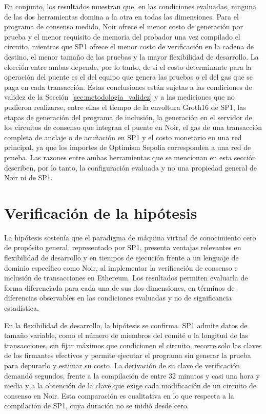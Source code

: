 En conjunto, los resultados muestran que, en las condiciones evaluadas, ninguna de las dos
herramientas domina a la otra en todas las dimensiones. Para el programa de consenso medido, Noir
ofrece el menor costo de generación por prueba y el menor requisito de memoria del probador una
vez compilado el circuito, mientras que SP1 ofrece el menor costo de verificación en la cadena de
destino, el menor tamaño de las pruebas y la mayor flexibilidad de desarrollo. La elección entre
ambas depende, por lo tanto, de si el costo
determinante para la operación del puente es el del equipo que genera las pruebas o el del gas que
se paga en cada transacción. Estas conclusiones están sujetas a las condiciones de validez de la
Sección~\ref{sec:metodologia_validez} y a las mediciones que no pudieron realizarse, entre ellas el
tiempo de la envoltura Groth16 de SP1, las etapas de generación del programa de inclusión, la
generación en el servidor de los circuitos de consenso que integran el puente en Noir, el gas de
una transacción completa de anclaje o de acuñación en SP1 y el costo monetario en una red
principal, ya que los importes de Optimism Sepolia corresponden a una red de prueba. Las razones entre ambas herramientas que se mencionan en esta sección describen, por lo
tanto, la configuración evaluada y no una propiedad general de Noir ni de SP1.

\section{Verificación de la hipótesis}
\label{sec:verificacion_hipotesis}

La hipótesis sostenía que el paradigma de máquina virtual de conocimiento cero de propósito
general, representado por SP1, presenta ventajas relevantes en flexibilidad de desarrollo y en
tiempos de ejecución frente a un lenguaje de dominio específico como Noir, al implementar la
verificación de consenso e inclusión de transacciones en Ethereum. Los resultados permiten
evaluarla de forma diferenciada para cada una de sus dos dimensiones, en términos de diferencias
observables en las condiciones evaluadas y no de significancia estadística.

En la flexibilidad de desarrollo, la hipótesis se confirma. SP1 admite datos de tamaño variable,
como el número de miembros del comité o la longitud de las transacciones, sin fijar máximos que
condicionen el circuito, recorre solo las claves de los firmantes efectivos y permite ejecutar el
programa sin generar la prueba para depurarlo y estimar su costo. La derivación de su clave de
verificación demandó segundos, frente a la compilación de entre 32 minutos y casi una hora y media
y a la obtención de la clave que exige cada modificación de un circuito de consenso en Noir. Esta comparación es
cualitativa en lo que respecta a la compilación de SP1, cuya duración no se midió desde cero.

